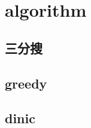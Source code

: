 %         

        
\section{algorithm}
    \subsection{三分搜}
        
    \columnbreak
    \subsection{greedy}
        
    \columnbreak
    \subsection{dinic}
        
    \columnbreak
